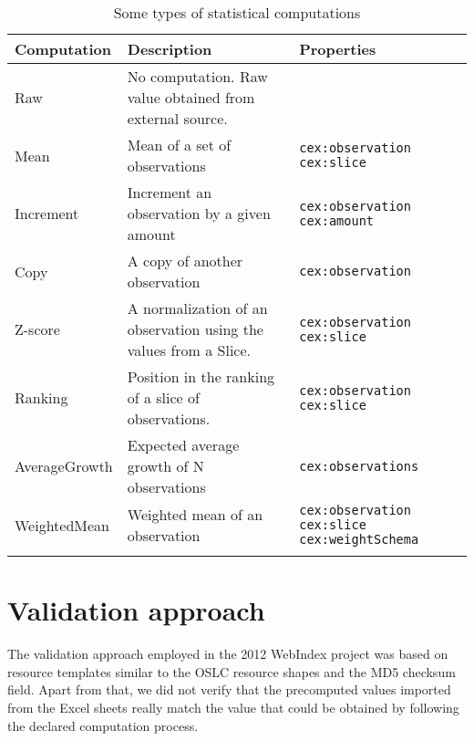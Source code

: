\begin{table*}[t]
\label{table:computations}
\begin{center}
\begin{tabular}{ p{} p{} p{}}
\toprule
Computation & Description & Properties \\
\hline
Raw			& No computation. Raw value obtained from external source.
			&  \\
Mean	    & Mean of a set of observations 
			& \lstinline|cex:observation| \newline 
			  \lstinline|cex:slice| \\
Increment	& Increment an observation by a given amount 
			& \lstinline|cex:observation| \newline 
			  \lstinline|cex:amount|  \\
Copy		& A copy of another observation 
			& \lstinline|cex:observation| \\
Z-score		& A normalization of an observation using the values from a Slice. 
			& \lstinline|cex:observation| \newline 
			  \lstinline|cex:slice| \\
Ranking		& Position in the ranking of a slice of observations. 
			& \lstinline|cex:observation| \newline 
			  \lstinline|cex:slice| \\
AverageGrowth & Expected average growth of N observations
			  & \lstinline|cex:observations| \\
WeightedMean & Weighted mean of an observation
			& \lstinline|cex:observation| \newline
			  \lstinline|cex:slice|       \newline
			  \lstinline|cex:weightSchema| \\
\bottomrule\\
\end{tabular}
\caption{Some types of statistical computations}
\end{center}
\end{table*}

\section{Validation approach}

The validation approach employed in the 2012 WebIndex project was based on
 resource templates similar to the OSLC resource
 shapes and
 the MD5 checksum field. 
 Apart from that, we did not verify that the precomputed values imported from
 the Excel sheets really match the value that could be obtained by 
 following the declared computation process.

